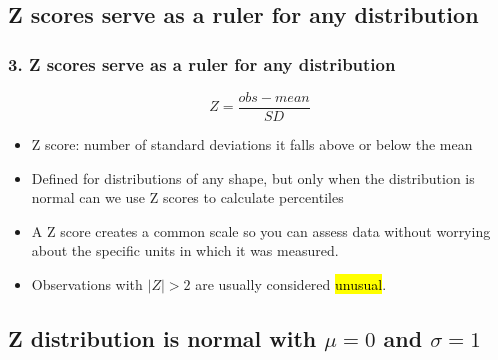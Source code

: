 \documentclass[11pt,containsverbatim,handout,xcolor=xelatex,dvipsnames,table]{beamer}
\begin{document}

\subsection{Z scores serve as a ruler for any distribution}
\label{mi3normal}


\begin{frame}
\frametitle{3. Z scores serve as a ruler for any distribution}

\[ Z = \frac{obs - mean}{SD} \]

\begin{itemize}

\item Z score: number of standard deviations it falls above or below the mean

\pause

\item Defined for distributions of any shape, but only when the distribution is normal can we use Z scores to calculate percentiles

\pause

\item A Z score creates a common scale so you can assess data without worrying about the specific units in which it was measured.

\pause

\item Observations with $|Z| > 2$ are usually considered \hl{unusual}.

\end{itemize}

\end{frame}


\subsection{Z distribution is normal with $\mu = 0$ and $\sigma = 1$}
\label{mi4normal}

\end{document}
